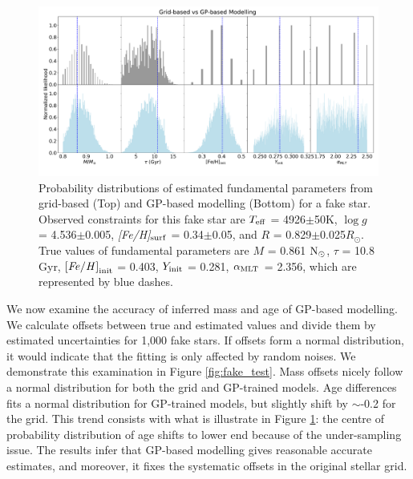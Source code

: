 \begin{figure}
	\includegraphics[width=1.9\columnwidth]{gp_fitting.pdf}
    \caption{Probability distributions of estimated fundamental parameters from grid-based (Top) and GP-based modelling (Bottom) for a fake star. Observed constraints for this fake star are $T_{\rm eff}$ = 4926$\pm$50K, $\log g$ = 4.536$\pm$0.005, {\it [Fe/H]}$_{\rm surf}$ =  0.34$\pm$0.05, and $R$ =  0.829$\pm$0.025$R_{\odot}$. True values of fundamental parameters are $M$ = 0.861 $\rm N_{\odot}$, $\tau$ = 10.8 Gyr, $\rm {\it [Fe/H]}_{init}$ = 0.403, $Y_{\rm init}$ = 0.281, $\alpha_{\rm MLT}$ = 2.356, which are represented by blue dashes.} 
  \label{fig:fit_comparison}
\end{figure}

We now examine the accuracy of inferred mass and age of GP-based modelling. We calculate offsets between true and estimated values and divide them by estimated uncertainties for 1,000 fake stars. If offsets form a normal distribution, it would indicate that the fitting is only affected by random noises.  
%
We demonstrate this examination in Figure \ref{fig:fake_test}. Mass offsets nicely follow a normal distribution for both the grid and GP-trained models. Age differences fits a normal distribution for GP-trained models, but slightly shift by $\sim$-0.2 for the grid. 
This trend consists with what is illustrate in Figure \ref{fig:fit_comparison}: the centre of probability distribution of age shifts to lower end because of the under-sampling issue. The results infer that GP-based modelling gives reasonable accurate estimates, and moreover, it fixes the systematic offsets in the original stellar grid.  

